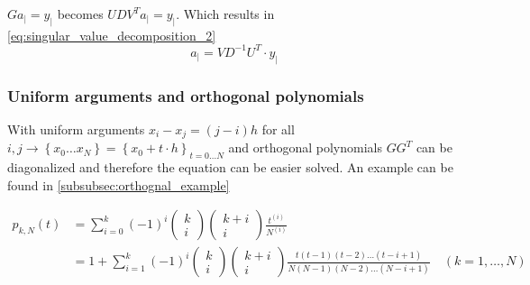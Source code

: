 $G a_|=y_|$ becomes $U D V^{T} a_|=y_|$. Which results in \autoref{eq:singular_value_decomposition_2}
\begin{equation}\label{eq:singular_value_decomposition_2}
a_|=V D^{-1} U^{T} \cdot y_|
\end{equation}





\subsubsection{Uniform arguments and orthogonal polynomials}
With uniform arguments $x_{i}-x_{j}=(j-i) h$ for all  $i, j \rightarrow\left\{x_{0} \ldots x_{N}\right\}=\left\{x_{0}+t \cdot h\right\}_{t=0 \ldots N}$ and orthogonal polynomials $G G^{T}$ can be diagonalized and therefore the equation can be easier solved. An example can be found in \autoref{subsubsec:orthognal_example}

\begin{equation}\label{eq:orthogonal_polynomials}
    \begin{aligned}
    p_{k, N}(t)&=\sum_{i=0}^{k}(-1)^{i}\left(\begin{array}{c}
    k \\
    i
    \end{array}\right)\left(\begin{array}{c}
    k+i \\
    i
    \end{array}\right) \frac{t^{(i)}}{N^{(i)}}\\&=1+\sum_{i=1}^{k}(-1)^{i}\left(\begin{array}{c}
    k \\
    i
    \end{array}\right)\left(\begin{array}{c}
    k+i \\
    i
    \end{array}\right) \frac{t(t-1)(t-2) \ldots(t-i+1)}{N(N-1)(N-2) \ldots(N-i+1)} \quad(k=1, \ldots, N)
    \end{aligned}
\end{equation}


